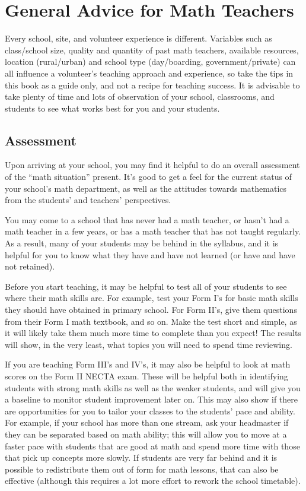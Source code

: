 \chapter{General Advice for Math Teachers}
Every school, site, and volunteer experience is different. Variables such as class\slash school size, quality and quantity of past math teachers, available resources, location (rural\slash urban) and school type (day\slash boarding, government\slash private) can all influence a volunteer's teaching approach and experience, so take the tips in this book as a guide only, and not a recipe for teaching success. It is advisable to take plenty of time and lots of observation of your school, classrooms, and students to see what works best for you and your students.
\section{Assessment}
Upon arriving at your school, you may find it helpful to do an overall assessment of the ``math situation'' present. It's good to get a feel for the current status of your school's math department, as well as the attitudes towards mathematics from the students' and teachers' perspectives.

You may come to a school that has never had a math teacher, or hasn't had a math teacher in a few years, or has a math teacher that has not taught regularly. As a result, many of your students may be behind in the syllabus, and it is helpful for you to know what they have and have not learned (or have and have not retained).

Before you start teaching, it may be helpful to test all of your students to see where their math skills are. For example, test your Form I's for basic math skills they should have obtained in primary school. For Form II's, give them questions from their Form I math textbook, and so on. Make the test short and simple, as it will likely take them much more time to complete than you expect! The results will show, in the very least, what topics you will need to spend time reviewing. 

If you are teaching Form III's and IV's, it may also be helpful to look at math scores on the Form II NECTA exam. These will be helpful both in identifying students with strong math skills as well as the weaker students, and will give you a baseline to monitor student improvement later on. This may also show if there are opportunities for you to tailor your classes to the students' pace and ability. For example, if your school has more than one stream, ask your headmaster if they can be separated based on math ability; this will allow you to move at a faster pace with students that are good at math and spend more time with those that pick up concepts more slowly. If students are very far behind and it is possible to redistribute them out of form for math lessons, that can also be effective (although this requires a lot more effort to rework the school timetable). 
	
